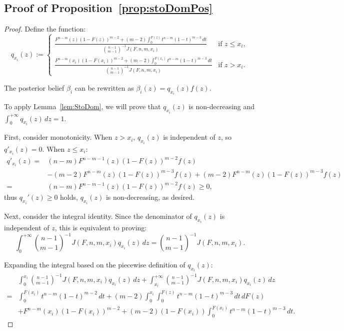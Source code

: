 \subsection*{Proof of Proposition~\ref{prop:stoDomPos}}
\begin{proof}
    Define the function:
    \[
    q_{x_i}(z) :=
    \begin{cases} 
    \frac{F^{n-m}(z)(1-F(z))^{m-2}+(m-2)\int_0^{F(z)}t^{n-m}(1-t)^{m-3}\, dt}{\binom{n-1}{m-1}^{-1}J(F,n,m,x_i)} & \text{if } z \leq x_i, \\
    \frac{F^{n-m}(x_i)(1-F(x_i))^{m-2} +(m-2)\int_0^{F(x_i)} t^{n-m}(1-t)^{m-3}\, dt}{\binom{n-1}{m-1}^{-1}J(F,n,m,x_i)} & \text{if } z > x_i.
    \end{cases}
    \]

    The posterior belief \(\beta_i\) can be rewritten as \(\beta_i(z) = q_{x_i}(z)f(z)\).

    To apply Lemma~\ref{lem:StoDom}, we will prove that \(q_{x_i}(z)\) is non-decreasing and \(\int_0^{+\infty}q_{x_i}(z)\,dz = 1\).

    First, consider monotonicity. When \(z > x_i\), \(q_{x_i}(z)\) is independent of \(z\), so \(q'_{x_i}(z) = 0\). When \(z \leq x_i\):
    \[
    \begin{aligned}
        q'_{x_i}(z) = & (n-m)F^{n-m-1}(z)(1-F(z))^{m-2}f(z) \\
                      & - (m-2)F^{n-m}(z)(1-F(z))^{m-3}f(z) + (m-2)F^{n-m}(z)(1-F(z))^{m-3}f(z) \\
                    = & (n-m)F^{n-m-1}(z)(1-F(z))^{m-2}f(z) \geq 0,
    \end{aligned}
    \]
    thus \(q_{x_i}'(z) \geq 0\) holds, $q_{x_i}(z)$ is non-decreasing, as desired.

    Next, consider the integral identity. Since the denominator of \(q_{x_i}(z)\) is independent of \(z\), this is equivalent to proving:
    \begin{equation}\label{eq:StoDomInt}
        \int_0^{+\infty}\binom{n-1}{m-1}^{-1}J(F,n,m,x_i)q_{x_i}(z)\,dz=\binom{n-1}{m-1}^{-1}J(F,n,m,x_i).
    \end{equation}

    Expanding the integral based on the piecewise definition of \(q_{x_i}(z)\):
    \[
    \begin{aligned}
        & \int_0^{x_i}\binom{n-1}{m-1}^{-1}J(F,n,m,x_i)q_{x_i}(z)\,dz + \int_{x_i}^{+\infty}\binom{n-1}{m-1}^{-1}J(F,n,m,x_i)q_{x_i}(z)\,dz \\
        = & \int_0^{F(x_i)}t^{n-m}(1-t)^{m-2}\, dt +(m-2)\int_0^{x_i}\int_0^{F(z)}t^{n-m}(1-t)^{m-3}\, dt\, dF(z) \\
        & + F^{n-m}(x_i)(1-F(x_i))^{m-2}+(m-2)(1-F(x_i))\int_0^{F(x_i)}t^{n-m}(1-t)^{m-3}\, dt.
    \end{aligned}
    \]


\end{proof}
